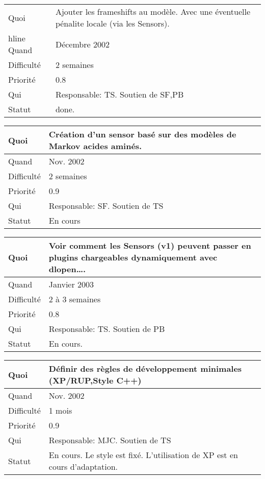 \documentclass[a4paper,11pt]{article}
\begin{document}
\begin{longtable}{|l|p{7cm}|}\hline
  Quoi & Ajouter les frameshifts au mod\`ele. Avec une \'eventuelle
  p\'enalite locale (via les Sensors). \\hline
  Quand  &  D\'ecembre 2002 \\\hline
  Difficult\'e &  2 semaines\\\hline
  Priorit\'e &  0.8\\\hline
  Qui & Responsable: TS. Soutien de SF,PB\\\hline
  Statut & done.\\\hline 
\end{longtable}

\begin{longtable}{|l|p{7cm}|}\hline
  Quoi & Cr\'eation d'un sensor bas\'e sur des mod\`eles de Markov acides amin\'es.\\\hline
  Quand  &  Nov. 2002\\\hline
  Difficult\'e &  2 semaines\\\hline
  Priorit\'e &  0.9 \\\hline
  Qui & Responsable: SF. Soutien de TS\\\hline
  Statut & En cours\\\hline
\end{longtable}
 
\begin{longtable}{|l|p{7cm}|}\hline
  Quoi & Voir comment les Sensors (v1) peuvent passer en plugins
  chargeables dynamiquement avec dlopen\ldots.\\\hline
  Quand  &  Janvier 2003\\\hline
  Difficult\'e &  2 \`a 3 semaines\\\hline
  Priorit\'e &  0.8\\\hline
  Qui & Responsable: TS. Soutien de PB \\\hline
  Statut & En cours.\\\hline
\end{longtable}

\begin{longtable}{|l|p{7cm}|}\hline
  Quoi & D\'efinir des r\`egles de d\'eveloppement minimales (XP/RUP,Style C++)\\\hline
  Quand  & Nov. 2002 \\\hline
  Difficult\'e & 1 mois \\\hline
  Priorit\'e &  0.9 \\\hline
  Qui & Responsable: MJC. Soutien de TS \\\hline
  Statut & En cours. Le style est fix\'e. L'utilisation de XP est en
  cours d'adaptation.\\\hline
\end{longtable}
\end{document}
